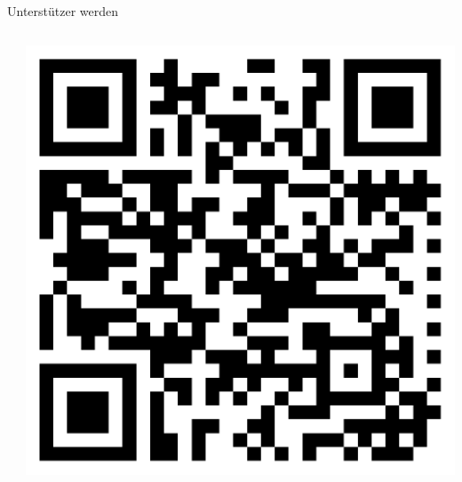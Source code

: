 \documentclass[final,utf8]{beamer}
\begin{document}
\begin{frame}{}
\begin{columns}[t]
\begin{column}{.45\linewidth}
\begin{block}{Unterst\"utzer werden}
\begin{columns}
\begin{column}{.65\textwidth}
	\end{column}
	\begin{column}{.2\textwidth}
 \includegraphics[width=\textwidth]{qrcode.png}
	\end{column}
\end{columns}
    
    \end{block}  
  \end{column}
\end{columns}
\vfill
\end{frame}
\end{document}
